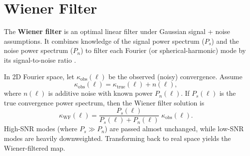 \section{Wiener Filter}
\label{sec:wiener-filter}

The \textbf{Wiener filter} is an optimal linear filter under Gaussian signal + noise assumptions. It combines knowledge of the signal power spectrum ($P_s$) and the noise power spectrum ($P_n$) to filter each Fourier (or spherical-harmonic) mode by its signal-to-noise ratio \citep{Press2007, Zaroubi1995}.

In 2D Fourier space, let $\kappa_{\mathrm{obs}}(\boldsymbol{\ell})$ be the observed (noisy) convergence. Assume 
\[
    \kappa_{\mathrm{obs}}(\boldsymbol{\ell}) 
    = \kappa_{\mathrm{true}}(\boldsymbol{\ell}) + n(\boldsymbol{\ell}),
\]
where $n(\boldsymbol{\ell})$ is additive noise with known power $P_n(\ell)$. If $P_s(\ell)$ is the true convergence power spectrum, then the Wiener filter solution is 
\begin{equation}
    \label{eq:wiener-filter}
    \kappa_{\mathrm{WF}}(\boldsymbol{\ell}) = \frac{P_s(\ell)}{P_s(\ell) + P_n(\ell)} 
    \;\kappa_{\mathrm{obs}}(\boldsymbol{\ell}).
\end{equation}
High-SNR modes (where $P_s \gg P_n$) are passed almost unchanged, while low-SNR modes are heavily downweighted. Transforming back to real space yields the Wiener-filtered map.